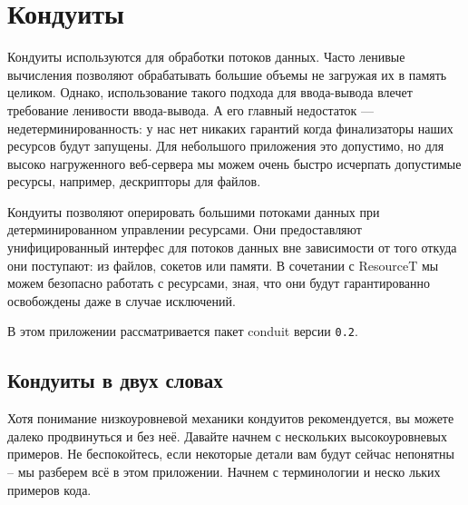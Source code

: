 \chapter{Кондуиты}

Кондуиты используются для обработки потоков данных. Часто ленивые вычисления
позволяют обрабатывать большие объемы не загружая их в память целиком. Однако, 
использование такого подхода для ввода-вывода влечет требование ленивости ввода-вывода.
А его главный недостаток --- недетерминированность: у нас нет никаких гарантий когда
финализаторы наших ресурсов будут запущены. Для небольшого приложения это допустимо, но
для высоко нагруженного веб-сервера мы можем очень быстро исчерпать допустимые ресурсы,
например, дескрипторы для файлов.

Кондуиты позволяют оперировать большими потоками данных при детерминированном управлении
ресурсами. Они предоставляют унифицированный интерфес для потоков данных вне зависимости
от того откуда они поступают: из файлов, сокетов или памяти. В сочетании с ResourceT мы
можем безопасно работать с ресурсами, зная, что они будут гарантированно освобождены даже
в случае исключений.

В этом приложении рассматривается пакет conduit версии \verb=0.2=.

\section{Кондуиты в двух словах}

Хотя понимание низкоуровневой механики кондуитов рекомендуется, вы можете далеко
продвинуться и без неё. Давайте начнем  с нескольких  высокоуровневых 	 примеров.  Не
беспокойтесь, если некоторые детали      вам   будут       сейчас	  непонятны -- 
  мы разберем всё  в этом   приложении. Начнем с терминологии    и	  неско
льких	   примеров    кода.


